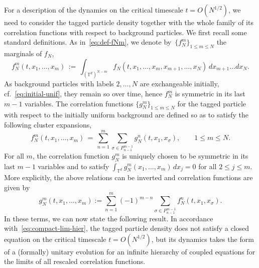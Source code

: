 \documentclass[a4paper,11pt,reqno,noindent]{amsart}
\theoremstyle{plain}
\numberwithin{equation}{section}
\newcommand{\T}{\mathbb T}
\newcommand{\3}{|\!|\!|}
\begin{document}
For a description of the dynamics on the critical timescale $t=O(N^{1/2})$, we need to consider the tagged particle density together with the whole family of its correlation functions with respect to background particles. We first recall some standard definitions.
As in~\eqref{eq:def-fNm}, we denote by~$\{f_N^m\}_{1\le m\le N}$ the marginals of $f_N$,
\begin{equation}\label{eq:def-fNm-re}
f_N^m(t,x_1,\ldots,x_m)\,:=\,\int_{(\T^d)^{N-m}}f_N(t,x_1,\ldots,x_m,x_{m+1},\ldots,x_N)\,dx_{m+1}\ldots dx_N.
\end{equation}
As background particles with labels $2,\ldots,N$ are exchangeable initially, cf.~\eqref{eq:initial-unif}, they remain so over time, hence $f_N^m$ is symmetric in its last $m-1$ variables.
The correlation functions $\{g_N^m\}_{1\le m\le N}$ for the tagged particle with respect to the initially uniform background are defined so as to satisfy the following cluster expansions,
\begin{equation}\label{eq:correl-def-clust}
f_N^m(t,x_1,\ldots,x_m)\,=\,\sum_{n=1}^m\sum_{\sigma\in P_{n-1}^{m-1}}g_N^{n}(t,x_1,x_\sigma),\qquad 1\le m\le N.
\end{equation}
For all $m$, the correlation function $g_N^m$ is uniquely chosen to be symmetric in its last $m-1$ variables and to satisfy $\int_{\T^d}g_N^m(x_1,\ldots,x_m)\,dx_j=0$ for all $2\le j\le m$.
More explicitly, the above relations can be inverted and correlation functions are given by
\begin{equation}\label{eq:correl-def}
g_N^m(t,x_1,\ldots,x_m):=\sum_{n=1}^m(-1)^{m-n}\sum_{\sigma\in P_{n-1}^{m-1}}f_N^{n}(t,x_1,x_\sigma).
\end{equation}
In these terms, we can now state the following result. In accordance with~\eqref{eq:compact-lim-hier}, the tagged particle density does not satisfy a closed equation on the critical timescale $t=O(N^{1/2})$, but its dynamics takes the form of a (formally) unitary evolution for an infinite hierarchy of coupled equations for the limits of all rescaled correlation functions.
\end{document}
